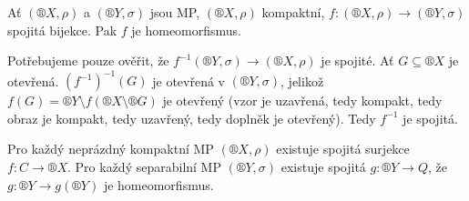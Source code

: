 \documentclass[12pt]{article}					%
\begin{document}
    \begin{lemma}
        Ať $(®X, \rho)$ a $(®Y, \sigma)$ jsou MP, $(®X, \rho)$ kompaktní, $f: (®X, \rho) \rightarrow (®Y, \sigma)$ spojitá bijekce. Pak $f$ je homeomorfismus.

        \begin{dukazin}
            Potřebujeme pouze ověřit, že $f^{-1}(®Y, \sigma) \rightarrow (®X, \rho)$ je spojité. Ať $G \subseteq ®X$ je otevřená. $(f^{-1})^{-1}(G)$ je otevřená v $(®Y, \sigma)$, jelikož $f(G) = ®Y \setminus f(®X \setminus ®G)$ je otevřený (vzor je uzavřená, tedy kompakt, tedy obraz je kompakt, tedy uzavřený, tedy doplněk je otevřený). Tedy $f^{-1}$ je spojitá.
        \end{dukazin}
    \end{lemma}

    \begin{veta}
        Pro každý neprázdný kompaktní MP $(®X, \rho)$ existuje spojitá surjekce $f: C \rightarrow ®X$. Pro každý separabilní MP $(®Y, \sigma)$ existuje spojitá $g: ®Y \rightarrow Q$, že $g: ®Y \rightarrow g(®Y)$ je homeomorfismus. 
    \end{veta}
\end{document}
